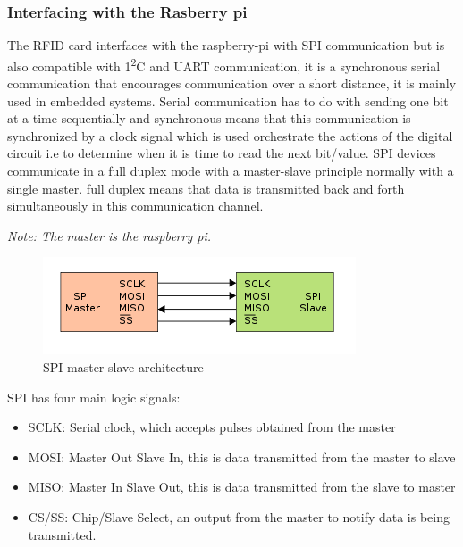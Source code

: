 \subsubsection{Interfacing with the Rasberry pi}
The RFID card interfaces with the raspberry-pi with SPI communication but is also compatible with 1\textsuperscript{2}C and UART communication, it is a synchronous serial communication that encourages communication over a short distance, it is mainly used in embedded systems. Serial communication has to do with sending one bit at a time sequentially and synchronous means that this communication is synchronized by a clock signal which is used orchestrate the actions of the digital circuit i.e to determine when it is time to read the next bit/value. SPI devices communicate in a full duplex mode with a master-slave principle normally with a single master. full duplex means that data is transmitted back and forth simultaneously in this communication channel.

\textit{Note: The master is the raspberry pi.}
\vspace{1cm}
\begin{figure}[ht]
  \centering
  \includegraphics{Background/images/350px-SPI_single_slave.svg.png.png}
  \caption{SPI master slave architecture}
\end{figure}
\vspace{1cm}

SPI has four main logic signals: 
\begin{itemize}
  \item SCLK: Serial clock, which accepts pulses obtained from the master
  \item MOSI: Master Out Slave In, this is data transmitted from the master to slave
  \item MISO: Master In Slave Out, this is data transmitted from the slave to master
  \item CS/SS: Chip/Slave Select, an output from the master to notify data is being transmitted.
\end{itemize}

